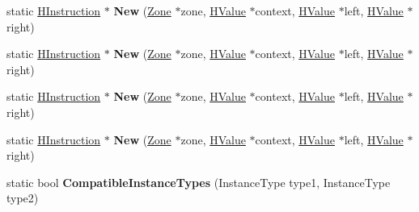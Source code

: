 \begin{DoxyCompactItemize}
\item 
\hypertarget{classv8_1_1internal_1_1_v8___f_i_n_a_l_ae2081c07c94daaf9b4f002f76d618c00}{}static \hyperlink{classv8_1_1internal_1_1_h_instruction}{H\+Instruction} $\ast$ {\bfseries New} (\hyperlink{classv8_1_1internal_1_1_zone}{Zone} $\ast$zone, \hyperlink{classv8_1_1internal_1_1_h_value}{H\+Value} $\ast$context, \hyperlink{classv8_1_1internal_1_1_h_value}{H\+Value} $\ast$left, \hyperlink{classv8_1_1internal_1_1_h_value}{H\+Value} $\ast$right)\label{classv8_1_1internal_1_1_v8___f_i_n_a_l_ae2081c07c94daaf9b4f002f76d618c00}

\item 
\hypertarget{classv8_1_1internal_1_1_v8___f_i_n_a_l_ae2081c07c94daaf9b4f002f76d618c00}{}static \hyperlink{classv8_1_1internal_1_1_h_instruction}{H\+Instruction} $\ast$ {\bfseries New} (\hyperlink{classv8_1_1internal_1_1_zone}{Zone} $\ast$zone, \hyperlink{classv8_1_1internal_1_1_h_value}{H\+Value} $\ast$context, \hyperlink{classv8_1_1internal_1_1_h_value}{H\+Value} $\ast$left, \hyperlink{classv8_1_1internal_1_1_h_value}{H\+Value} $\ast$right)\label{classv8_1_1internal_1_1_v8___f_i_n_a_l_ae2081c07c94daaf9b4f002f76d618c00}

\item 
\hypertarget{classv8_1_1internal_1_1_v8___f_i_n_a_l_ae2081c07c94daaf9b4f002f76d618c00}{}static \hyperlink{classv8_1_1internal_1_1_h_instruction}{H\+Instruction} $\ast$ {\bfseries New} (\hyperlink{classv8_1_1internal_1_1_zone}{Zone} $\ast$zone, \hyperlink{classv8_1_1internal_1_1_h_value}{H\+Value} $\ast$context, \hyperlink{classv8_1_1internal_1_1_h_value}{H\+Value} $\ast$left, \hyperlink{classv8_1_1internal_1_1_h_value}{H\+Value} $\ast$right)\label{classv8_1_1internal_1_1_v8___f_i_n_a_l_ae2081c07c94daaf9b4f002f76d618c00}

\item 
\hypertarget{classv8_1_1internal_1_1_v8___f_i_n_a_l_ae2081c07c94daaf9b4f002f76d618c00}{}static \hyperlink{classv8_1_1internal_1_1_h_instruction}{H\+Instruction} $\ast$ {\bfseries New} (\hyperlink{classv8_1_1internal_1_1_zone}{Zone} $\ast$zone, \hyperlink{classv8_1_1internal_1_1_h_value}{H\+Value} $\ast$context, \hyperlink{classv8_1_1internal_1_1_h_value}{H\+Value} $\ast$left, \hyperlink{classv8_1_1internal_1_1_h_value}{H\+Value} $\ast$right)\label{classv8_1_1internal_1_1_v8___f_i_n_a_l_ae2081c07c94daaf9b4f002f76d618c00}

\item 
\hypertarget{classv8_1_1internal_1_1_v8___f_i_n_a_l_a91c409f3300f2c1f0f30c5c808db5bbe}{}static bool {\bfseries Compatible\+Instance\+Types} (Instance\+Type type1, Instance\+Type type2)\label{classv8_1_1internal_1_1_v8___f_i_n_a_l_a91c409f3300f2c1f0f30c5c808db5bbe}


\end{DoxyCompactItemize}

